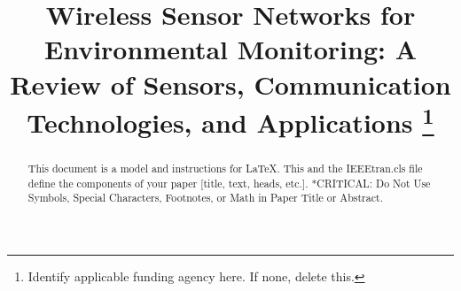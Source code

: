 \documentclass[conference]{IEEEtran}
\begin{document}
\title{Wireless Sensor Networks for Environmental Monitoring: A Review of Sensors, Communication Technologies, and Applications
\thanks{Identify applicable funding agency here. If none, delete this.}
}

\author{
\and
{}
}

\maketitle

\begin{abstract}
This document is a model and instructions for \LaTeX.
This and the IEEEtran.cls file define the components of your paper [title, text, heads, etc.]. *CRITICAL: Do Not Use Symbols, Special Characters, Footnotes, 
or Math in Paper Title or Abstract.
\end{abstract}
\end{document}
